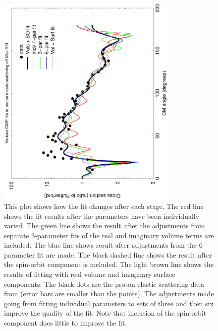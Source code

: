 \documentclass[]{scrartcl}
\begin{document}
\begin{figure}
\centering
	\includegraphics[width=0.78\textwidth,angle=270]{plots/SOfinal.eps}
	\caption{This plot shows how the fit changes after each stage. The red line shows the fit results after the parameters have been individually varied. The green line shows the result after the adjustments from separate 3-parameter fits of the real and imaginary volume terms are included. The blue line shows result after adjustments from the 6-parameter fit are made. The black dashed line shows the result after the spin-orbit component is included. The light brown line shows the results of fitting with real volume and imaginary surface components. The black dots are the proton elastic scattering data from \citep{Sinha1972} (error bars are smaller than the points). The adjustments made going from fitting individual parameters to sets of three and then six improve the quality of the fit. Note that inclusion of the spin-orbit component does little to improve the fit.}
	\label{fig:fits}
\end{figure}


\end{document}
